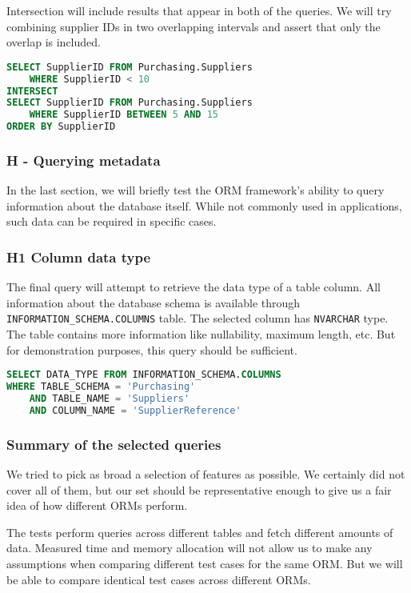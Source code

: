 Intersection will include results that appear in both of the queries. We will try combining supplier IDs in two overlapping intervals and assert that only the overlap is included. 

\begin{lstlisting}[language=SQL]
SELECT SupplierID FROM Purchasing.Suppliers 
    WHERE SupplierID < 10
INTERSECT
SELECT SupplierID FROM Purchasing.Suppliers 
    WHERE SupplierID BETWEEN 5 AND 15
ORDER BY SupplierID
\end{lstlisting}

\subsubsection{H - Querying metadata}
In the last section, we will briefly test the ORM framework's ability to query information about the database itself. While not commonly used in applications, such data can be required in specific cases.

\subsubsection*{H1 Column data type} \label{query:h1}
The final query will attempt to retrieve the data type of a table column. All information about the database schema is available through \texttt{INFORMATION\_SCHEMA.COLUMNS} table. The selected column has \texttt{NVARCHAR} type. The table contains more information like nullability, maximum length, etc. But for demonstration purposes, this query should be sufficient.

\begin{lstlisting}[language=SQL]
SELECT DATA_TYPE FROM INFORMATION_SCHEMA.COLUMNS 
WHERE TABLE_SCHEMA = 'Purchasing'
    AND TABLE_NAME = 'Suppliers'
    AND COLUMN_NAME = 'SupplierReference'
\end{lstlisting}

\subsubsection{Summary of the selected queries}
We tried to pick as broad a selection of features as possible. 
We certainly did not cover all of them, but our set should be representative enough to give us a fair idea of how different ORMs perform. 

The tests perform queries across different tables and fetch different amounts of data. 
Measured time and memory allocation will not allow us to make any assumptions when comparing different test cases for the same ORM.
But we will be able to compare identical test cases across different ORMs.

